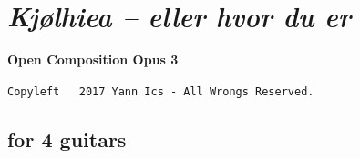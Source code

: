 \newpage

{}
\thispagestyle{empty}

\section*{\textsl{Kj{\o}lhiea -- eller hvor du er}}
\label{kjcc}

\begin{center} 
\textbf{Open Composition Opus 3}

{\scriptsize  \texttt{Copyleft \textcopyleft \, 2017 Yann Ics - All Wrongs Reserved.}}
 \end{center} 
 
\subsection*{\quad for 4 guitars}
\label{kjccqg}
\label{kj}

\vspace{-5mm}


